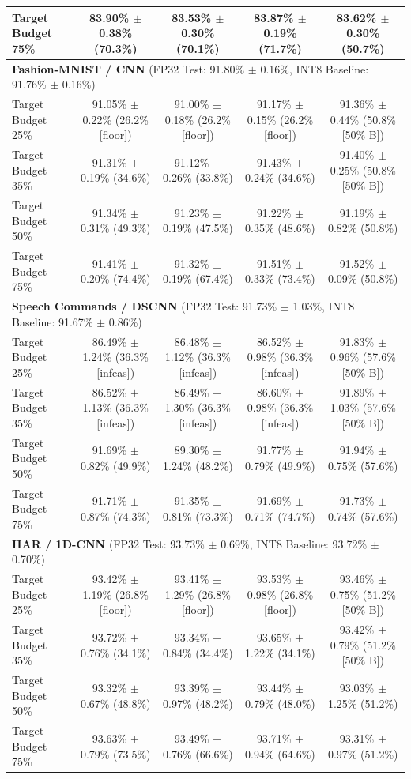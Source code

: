 \begin{table}[!t]
\begin{tabular}{lcccc}
\quad Target Budget 75\% & 83.90\% $\pm$ 0.38\% (70.3\%) & 83.53\% $\pm$ 0.30\% (70.1\%) & 83.87\% $\pm$ 0.19\% (71.7\%) & 83.62\% $\pm$ 0.30\% (50.7\%) \\
\midrule
\multicolumn{5}{l}{\textbf{Fashion-MNIST / CNN} (FP32 Test: 91.80\% $\pm$ 0.16\%, INT8 Baseline: 91.76\% $\pm$ 0.16\%)}\\
\quad Target Budget 25\% & 91.05\% $\pm$ 0.22\% (26.2\% [floor]) & 91.00\% $\pm$ 0.18\% (26.2\% [floor]) & 91.17\% $\pm$ 0.15\% (26.2\% [floor]) & 91.36\% $\pm$ 0.44\% (50.8\% [50\% B]) \\
\quad Target Budget 35\% & 91.31\% $\pm$ 0.19\% (34.6\%) & 91.12\% $\pm$ 0.26\% (33.8\%) & 91.43\% $\pm$ 0.24\% (34.6\%) & 91.40\% $\pm$ 0.25\% (50.8\% [50\% B]) \\
\quad Target Budget 50\% & 91.34\% $\pm$ 0.31\% (49.3\%) & 91.23\% $\pm$ 0.19\% (47.5\%) & 91.22\% $\pm$ 0.35\% (48.6\%) & 91.19\% $\pm$ 0.82\% (50.8\%) \\
\quad Target Budget 75\% & 91.41\% $\pm$ 0.20\% (74.4\%) & 91.32\% $\pm$ 0.19\% (67.4\%) & 91.51\% $\pm$ 0.33\% (73.4\%) & 91.52\% $\pm$ 0.09\% (50.8\%) \\
\midrule
\multicolumn{5}{l}{\textbf{Speech Commands / DSCNN} (FP32 Test: 91.73\% $\pm$ 1.03\%, INT8 Baseline: 91.67\% $\pm$ 0.86\%)}\\
\quad Target Budget 25\% & 86.49\% $\pm$ 1.24\% (36.3\% [infeas]) & 86.48\% $\pm$ 1.12\% (36.3\% [infeas]) & 86.52\% $\pm$ 0.98\% (36.3\% [infeas]) & 91.83\% $\pm$ 0.96\% (57.6\% [50\% B]) \\
\quad Target Budget 35\% & 86.52\% $\pm$ 1.13\% (36.3\% [infeas]) & 86.49\% $\pm$ 1.30\% (36.3\% [infeas]) & 86.60\% $\pm$ 0.98\% (36.3\% [infeas]) & 91.89\% $\pm$ 1.03\% (57.6\% [50\% B]) \\
\quad Target Budget 50\% & 91.69\% $\pm$ 0.82\% (49.9\%) & 89.30\% $\pm$ 1.24\% (48.2\%) & 91.77\% $\pm$ 0.79\% (49.9\%) & 91.94\% $\pm$ 0.75\% (57.6\%) \\
\quad Target Budget 75\% & 91.71\% $\pm$ 0.87\% (74.3\%) & 91.35\% $\pm$ 0.81\% (73.3\%) & 91.69\% $\pm$ 0.71\% (74.7\%) & 91.73\% $\pm$ 0.74\% (57.6\%) \\
\midrule
\multicolumn{5}{l}{\textbf{HAR / 1D-CNN} (FP32 Test: 93.73\% $\pm$ 0.69\%, INT8 Baseline: 93.72\% $\pm$ 0.70\%)}\\
\quad Target Budget 25\% & 93.42\% $\pm$ 1.19\% (26.8\% [floor]) & 93.41\% $\pm$ 1.29\% (26.8\% [floor]) & 93.53\% $\pm$ 0.98\% (26.8\% [floor]) & 93.46\% $\pm$ 0.75\% (51.2\% [50\% B]) \\
\quad Target Budget 35\% & 93.72\% $\pm$ 0.76\% (34.1\%) & 93.34\% $\pm$ 0.84\% (34.4\%) & 93.65\% $\pm$ 1.22\% (34.1\%) & 93.42\% $\pm$ 0.79\% (51.2\% [50\% B]) \\
\quad Target Budget 50\% & 93.32\% $\pm$ 0.67\% (48.8\%) & 93.39\% $\pm$ 0.97\% (48.2\%) & 93.44\% $\pm$ 0.79\% (48.0\%) & 93.03\% $\pm$ 1.25\% (51.2\%) \\
\quad Target Budget 75\% & 93.63\% $\pm$ 0.79\% (73.5\%) & 93.49\% $\pm$ 0.76\% (66.6\%) & 93.71\% $\pm$ 0.94\% (64.6\%) & 93.31\% $\pm$ 0.97\% (51.2\%) \\
\bottomrule
\end{tabular}
\end{table}

